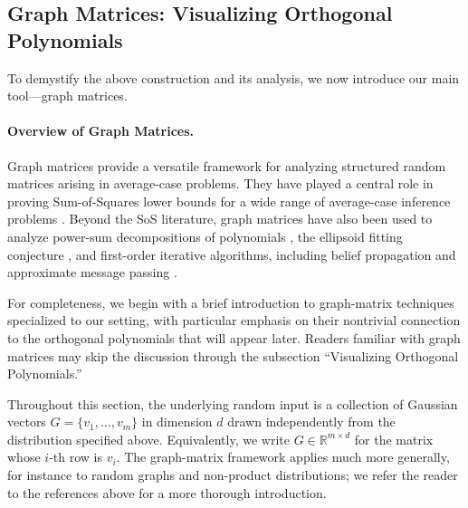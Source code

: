 \documentclass[12pt]{article}
\newcommand{\Authornote}[3]{{\sf\footnotesize\color{#3}{[#1: #2]}}}
\newcommand{\Authornote}[3]{}
\newcommand{\snote}[1]{\Authornote{Sofia}{#1}{orange}}
\begin{document}

\subsection{Graph Matrices:
 Visualizing Orthogonal Polynomials} \label{sec:graph-matrix}

 To demystify the above construction and its analysis, we now introduce our main tool---graph matrices.
 
\paragraph{Overview of Graph Matrices.}
Graph matrices provide a versatile framework for analyzing structured random matrices
arising in average-case problems. They have played a central role in proving
Sum-of-Squares lower bounds for a wide range of average-case inference problems
\cite{BHKKMP16, PR20, pang:LIPIcs.CCC.2021.26, JPRTX, JPRX23, KPX24, NGCA24, Xu25, PX25,
PotechinXu2026Theta}. Beyond the SoS literature, graph matrices have also been used
to analyze power-sum decompositions of polynomials \cite{BHKX22}, the ellipsoid
fitting conjecture \cite{PTVW22, HKPX23}, and first-order iterative algorithms,
including belief propagation and approximate message passing \cite{JP24}.


For completeness, we begin with a brief introduction to graph-matrix techniques specialized to our setting, with particular emphasis on their nontrivial connection to the orthogonal polynomials that will appear later. Readers familiar with graph matrices may skip the discussion through the subsection ``Visualizing Orthogonal Polynomials.'' 

Throughout this section, the underlying random input is a collection of
Gaussian vectors
\(G =
  \{v_1,\ldots,v_m\} 
\) in dimension $d$ 
drawn independently from the distribution specified above. Equivalently, we write
\(G\in \mathbb R^{m\times d}\) for the matrix whose \(i\)-th row is \(v_i\).
The graph-matrix framework applies much more generally, for instance to random
graphs and  non-product distributions; we refer the reader to the references above
for a more thorough introduction.
\end{document}
